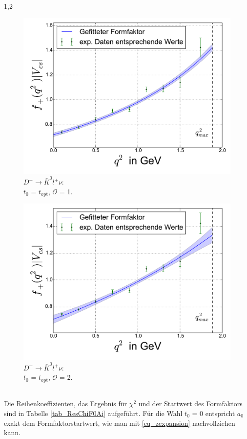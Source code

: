 \documentclass[11pt,a4paper,twoside]{report}
\begin{document}
\begin{spacing}{1,2}
 \begin{minipage}[H]{0.45\textwidth}
 \begin{figure}[H]
 \includegraphics[width=1\textwidth]{Fit/D+-1Ord-t0.pdf}
 \caption{$D^+\rightarrow \bar K^0 l^+ \nu$: \\$t_0$ = $t_{\text{opt}}$, $\mathcal{O}$ = 1.}
 \vspace{0.5cm}
 \label{pic_D+-1Ord-t0}
 \end{figure}
 \end{minipage}
 \hfill
 \begin{minipage}[H]{0.45\textwidth}
 \begin{figure}[H]
 \includegraphics[width=1\textwidth]{Fit/D+-2Ord-t0.pdf}
 \caption{$D^+\rightarrow \bar K^0 l^+ \nu$: \\$t_0$ = $t_{\text{opt}}$, $\mathcal{O}$ = 2.}
 \vspace{0.5cm}
 \label{pic_D+-2Ord-t0}
 \end{figure}
 \end{minipage}
\\
\noindent
Die Reihenkoeffizienten, das Ergebnis für $\chi^2$ und der Startwert des Formfaktors sind in Tabelle \ref{tab_ResChiF0Ai} aufgeführt. Für die Wahl $t_0$ = 0 entspricht
$a_0$ exakt dem Formfaktorstartwert, wie man mit \eqref{eq_zexpansion} nachvollziehen kann.


\end{spacing}
\end{document}
